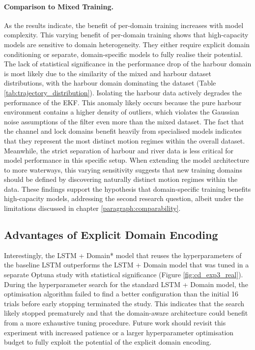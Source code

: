 \paragraph{Comparison to Mixed Training.}
As the results indicate, the benefit of per-domain training increases with model complexity. This varying benefit of per-domain training shows that high-capacity models are sensitive to domain heterogeneity.
They either require explicit domain conditioning or separate, domain-specific models to fully realise their potential.
The lack of statistical significance in the performance drop of the harbour domain is most likely due to the similarity of the mixed and harbour dataset distributions, with the harbour domain dominating the dataset (Table %
\ref{tab:trajectory_distribution}). 
Isolating the harbour data actively degrades the performance of the \ac{EKF}.
This anomaly likely occurs because the pure harbour environment contains a higher density of %
outliers, which violates the Gaussian noise assumptions of the filter even more %
than the mixed dataset. %
The fact that the channel and lock domains benefit heavily from specialised models indicates that they represent the most distinct motion regimes within the overall dataset.
Meanwhile, the strict separation of harbour and river data is less critical for model performance in this specific setup.
When extending the model architecture to more waterways, this varying sensitivity suggests that new training domains should be defined by discovering naturally distinct motion regimes within the data. 
These findings support the hypothesis that domain-specific training benefits high-capacity models, addressing the second research question, albeit under the limitations discussed in chapter \ref{paragraph:comparability}.




\subsection*{Advantages of Explicit Domain Encoding} 

Interestingly, the LSTM + Domain* model that reuses the hyperparameters of the baseline LSTM outperforms the LSTM + Domain model that was tuned in a separate Optuna study with statistical significance (Figure \ref{fig:cd_exp3_real}). %
During the hyperparameter search for the standard LSTM + Domain model, the optimisation algorithm failed to find a better configuration than the initial 16 trials before early stopping terminated the study.
This indicates that the search likely stopped prematurely and that the domain-aware architecture could benefit from a more exhaustive tuning procedure.
Future work should revisit this experiment with increased patience or a larger hyperparameter optimisation budget to fully exploit the potential of the explicit domain encoding.

